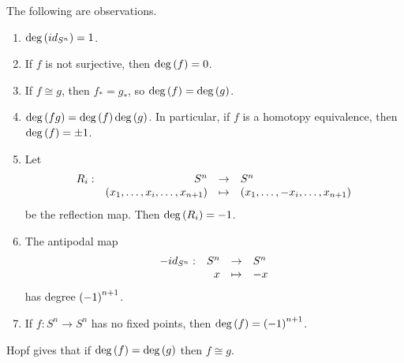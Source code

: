 \begin{proposition}
The following are observations.
\begin{enumerate}
\item $ \deg\left( id_{S^n} \right) = 1 $.
\item If $ f $ is not surjective, then $ \deg\left( f \right) = 0 $.
\item If $ f \cong g $, then $ f_* = g_* $, so $ \deg\left( f \right) = \deg\left( g \right) $.
\item $ \deg\left( fg \right) = \deg\left( f \right)\deg\left( g \right) $. In particular, if $ f $ is a homotopy equivalence, then $ \deg\left( f \right) = \pm 1 $.
\item Let
$$ \function[R_i]{S^n}{S^n}{\rb{x_1, \dots, x_i, \dots, x_{n + 1}}}{\rb{x_1, \dots, -x_i, \dots, x_{n + 1}}} $$
be the reflection map. Then $ \deg\left( R_i \right) = -1 $.
\item The antipodal map
$$ \function[-id_{S^n}]{S^n}{S^n}{x}{-x} $$
has degree $ \left( -1 \right)^{n + 1} $.
\item If $ f : S^n \to S^n $ has no fixed points, then $ \deg\left( f \right) = \left( -1 \right)^{n + 1} $.
\end{enumerate}
\end{proposition}

Hopf gives that if $ \deg\left( f \right) = \deg\left( g \right) $ then $ f \cong g $.

